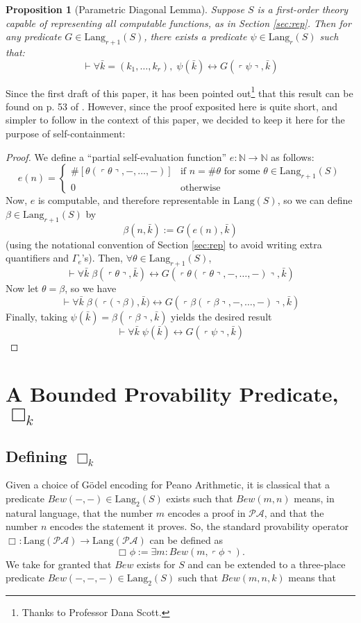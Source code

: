 \documentclass[onecolumn]{miri-tech-article}
\newtheorem{proposition}[theorem]{Proposition}
\numberwithin{equation}{section}
\theoremstyle{definition}
\newcommand{\NN}{\mathbb{N}}
\newcommand{\proves}[1]{\underset{#1}{\vdash}}
\newcommand{\bx}[1]{\Box_{#1}}
\newcommand{\PA}{\mathcal{P}\!\mathcal{A}}
\newcommand{\Lang}{\mathrm{Lang}}
\renewcommand{\to}{\rightarrow}
\renewcommand{\iff}{\leftrightarrow}
\newcommand{\qquote}[1]{\left\ulcorner #1 \right\urcorner}
\renewcommand{\-}{^{-1}}
\begin{document}
\begin{proposition}[Parametric Diagonal Lemma]Suppose $S$ is a first-order theory capable of representing all computable functions, as in Section \ref{sec:rep}.  Then for any predicate $G\in\Lang_{r+1}(S)$, there exists a predicate $\psi\in\Lang_r(S)$ such that: \\
$$\proves{} \forall \bar k = (k_1,\ldots,k_r), \; \psi(\bar k) \iff G(\qquote\psi,\bar k)$$
\end{proposition}

Since the first draft of this paper, it has been pointed out\footnote{Thanks to Professor Dana Scott.} that this result can be found on p. 53 of \cite{Boolos:1993:Logic}.  However, since the proof exposited here is quite short, and simpler to follow in the context of this paper, we decided to keep it here for the purpose of self-containment:

\begin{proof}
We define a ``partial self-evaluation function'' $e:\NN\to\NN$ as follows: 
$$e(n) = \begin{cases} 
\#\left[\theta(\qquote\theta,-,\ldots,-)\right] &\mbox{if } n = \#\theta \text{ for some }\theta\in\Lang_{r+1}(S) \\ 
0 & \mbox{otherwise }
\end{cases}
$$
Now, $e$ is computable, and therefore representable in $\Lang(S)$, so we can define $\beta\in\Lang_{r+1}(S)$ by 
$$\beta(n,\bar k) := G(e(n),\bar k)$$ 
(using the notational convention of Section \ref{sec:rep} to avoid writing extra quantifiers and $\Gamma_e$'s).  Then, $\forall \theta\in\Lang_{r+1}(S)$,
$$\proves{} \forall \bar k\; \beta(\qquote{\theta},\bar k) \iff G(\qquote{\theta(\qquote{\theta},-,\ldots,-)},\bar k)$$
Now let $\theta = \beta$, so we have
$$\proves{} \forall \bar k\; \beta(\qquote(\beta),\bar k) \iff G(\qquote{\beta(\qquote{\beta},-,\ldots,-)},\bar k)$$
%
Finally, taking $\psi(\bar k) = \beta(\qquote{\beta},\bar k)$ yields the desired result
$$\proves{} \forall \bar k\; \psi(\bar k) \iff G(\qquote{\psi},\bar k)$$


\end{proof}

\section{A Bounded Provability Predicate, \texorpdfstring{$\bx{k}$}{box k}} \label{sec:bpp}
\subsection{Defining \texorpdfstring{$\bx{k}$}{box k}}
Given a choice of G\"{o}del encoding for Peano Arithmetic, it is classical that a predicate $Bew(-,-) \in \Lang_2(S)$ exists such that $Bew(m,n)$ means, in natural language, that the number $m$ encodes a proof in $\PA$, and that the number $n$ encodes the statement it proves.  So, the standard provability operator $\bx{}:\Lang(\PA)\to\Lang(\PA)$ can be defined as
$$\bx{}\phi := \exists m : Bew(m,\qquote\phi).$$
We take for granted that $Bew$ exists for $S$ and can be extended to a three-place predicate $Bew(-,-,-) \in \Lang_2(S)$ such that $Bew(m,n,k)$ means that 
\end{document}

